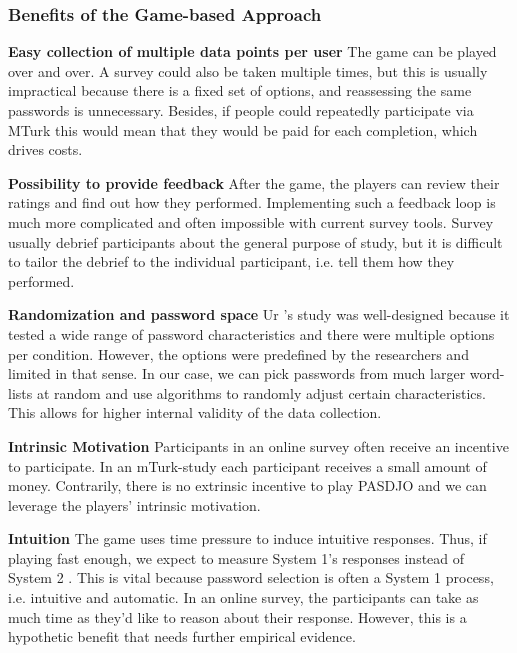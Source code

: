 \subsubsection{Benefits of the Game-based Approach}
\textbf{Easy collection of multiple data points per user} The game can be played over and over. A survey could also be taken multiple times, but this is usually impractical because there is a fixed set of options, and reassessing the same passwords is unnecessary. Besides, if people could repeatedly participate via MTurk this would mean that they would be paid for each completion, which drives costs.

\vspace*{1ex}
\noindent\textbf{Possibility to provide feedback} After the game, the players can review their ratings and find out how they performed. Implementing such a feedback loop is much more complicated and often impossible with current survey tools. Survey usually debrief participants about the general purpose of study, but it is difficult to tailor the debrief to the individual participant, i.e. tell them how they performed.

\vspace*{1ex}
\noindent\textbf{Randomization and password space} Ur \etal's study was well-designed because it tested a wide range of password characteristics and there were multiple options per condition. However, the options were predefined by the researchers and limited in that sense. In our case, we can pick passwords from much larger word-lists at random and use algorithms to randomly adjust certain characteristics. This allows for higher internal validity of the data collection.

\vspace*{1ex}
\noindent\textbf{Intrinsic Motivation} Participants in an online survey often receive an incentive to participate. In an \gls{mTurk}-study each participant receives a small amount of money. Contrarily, there is no extrinsic incentive to play PASDJO and we can leverage the players' intrinsic motivation. 

\vspace*{1ex}
\noindent\textbf{Intuition} The game uses time pressure to induce intuitive responses. Thus, if playing fast enough, we expect to measure System 1's responses instead of System 2 \cite{Kahnemann2011FastAndSlow}. This is vital because password selection is often a System 1 process, i.e. intuitive and automatic. In an online survey, the participants can take as much time as they'd like to reason about their response. However, this is a hypothetic benefit that needs further empirical evidence. 

